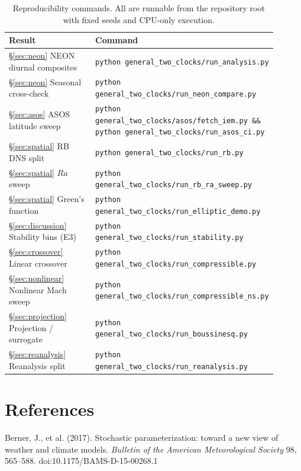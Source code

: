 \documentclass[11pt]{article}
\begin{document}
\begin{table}[h]
\centering
\caption{Reproducibility commands. All are runnable from the repository root with
fixed seeds and CPU-only execution.}
\label{tab:commands}
\small
\begin{tabular}{p{0.35\linewidth}p{0.55\linewidth}}
\toprule
Result & Command \\
\midrule
\S\ref{sec:neon} NEON diurnal composites &
\texttt{python general\_two\_clocks/run\_analysis.py} \\
\S\ref{sec:neon} Seasonal cross-check &
\texttt{python general\_two\_clocks/run\_neon\_compare.py} \\
\S\ref{sec:asos} ASOS latitude sweep &
\texttt{python general\_two\_clocks/asos/fetch\_iem.py \&\&
python general\_two\_clocks/run\_asos\_ci.py} \\
\S\ref{sec:spatial} RB DNS split &
\texttt{python general\_two\_clocks/run\_rb.py} \\
\S\ref{sec:spatial} $Ra$ sweep &
\texttt{python general\_two\_clocks/run\_rb\_ra\_sweep.py} \\
\S\ref{sec:spatial} Green's function &
\texttt{python general\_two\_clocks/run\_elliptic\_demo.py} \\
\S\ref{sec:discussion} Stability bins (E3) &
\texttt{python general\_two\_clocks/run\_stability.py} \\
\S\ref{sec:crossover} Linear crossover &
\texttt{python general\_two\_clocks/run\_compressible.py} \\
\S\ref{sec:nonlinear} Nonlinear Mach sweep &
\texttt{python general\_two\_clocks/run\_compressible\_ns.py} \\
\S\ref{sec:projection} Projection / surrogate &
\texttt{python general\_two\_clocks/run\_boussinesq.py} \\
\S\ref{sec:reanalysis} Reanalysis split &
\texttt{python general\_two\_clocks/run\_reanalysis.py} \\
\bottomrule
\end{tabular}
\end{table}

\section*{References}

Berner, J., et al. (2017). Stochastic parameterization: toward a new view of weather and climate models. \emph{Bulletin of the American Meteorological Society} 98, 565--588. doi:10.1175/BAMS-D-15-00268.1
\end{document}
